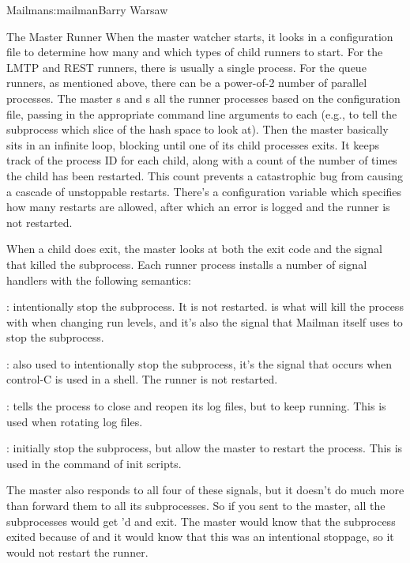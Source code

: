 \begin{aosachapter}{Mailman}{s:mailman}{Barry Warsaw}
\begin{aosasect1}{The Master Runner}
When the master watcher starts, it looks in a configuration file to
determine how many and which types of child runners to start.  For the
LMTP and REST runners, there is usually a single process.  For the
queue runners, as mentioned above, there can be a power-of-2 number of
parallel processes.  The master s and s all
the runner processes based on the configuration file, passing in the
appropriate command line arguments to each (e.g., to tell the
subprocess which slice of the hash space to look at).  Then the master
basically sits in an infinite loop, blocking until one of its child
processes exits.  It keeps track of the process ID for each child,
along with a count of the number of times the child has been
restarted.  This count prevents a catastrophic bug from causing a
cascade of unstoppable restarts.  There's a configuration variable
which specifies how many restarts are allowed, after which an error is
logged and the runner is not restarted.

When a child does exit, the master looks at both the exit code and the
signal that killed the subprocess.  Each runner process installs a
number of signal handlers with the following semantics:

\begin{aosaitemize}

\item{}: intentionally stop the subprocess.  It is not
  restarted.   is what  will kill the process
  with when changing run levels, and it's also the signal that Mailman
  itself uses to stop the subprocess.

\item{}: also used to intentionally stop the subprocess,
  it's the signal that occurs when control-C is used in a shell.  The
  runner is not restarted.

\item{}: tells the process to close and reopen its log
  files, but to keep running.  This is used when rotating log files.

\item{}: initially stop the subprocess, but allow the
  master to restart the process.  This is used in the 
  command of init scripts.

\end{aosaitemize}

The master also responds to all four of these signals, but it doesn't
do much more than forward them to all its subprocesses.  So if you
sent  to the master, all the subprocesses would get
'd and exit.  The master would know that the subprocess
exited because of  and it would know that this was an
intentional stoppage, so it would not restart the runner.


\end{aosasect1}
\end{aosachapter}
